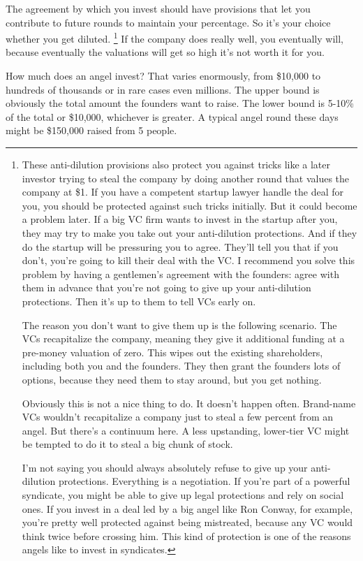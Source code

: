 The agreement by which you invest should have provisions that let you
contribute to future rounds to maintain your percentage. So it's your
choice whether you get diluted. \footnote{These anti-dilution provisions also protect you against tricks
like a later investor trying to steal the company by doing another round
that values the company at \$1. If you have a competent startup lawyer
handle the deal for you, you should be protected against such tricks
initially. But it could become a problem later. If a big VC firm wants
to invest in the startup after you, they may try to make you take out
your anti-dilution protections. And if they do the startup will be
pressuring you to agree. They'll tell you that if you don't, you're
going to kill their deal with the VC. I recommend you solve this problem
by having a gentlemen's agreement with the founders: agree with them in
advance that you're not going to give up your anti-dilution protections.
Then it's up to them to tell VCs early on.

The reason you don't want to give them up is the following scenario. The
VCs recapitalize the company, meaning they give it additional funding at
a pre-money valuation of zero. This wipes out the existing shareholders,
including both you and the founders. They then grant the founders lots
of options, because they need them to stay around, but you get nothing.

Obviously this is not a nice thing to do. It doesn't happen often.
Brand-name VCs wouldn't recapitalize a company just to steal a few
percent from an angel. But there's a continuum here. A less upstanding,
lower-tier VC might be tempted to do it to steal a big chunk of stock.

I'm not saying you should always absolutely refuse to give up your
anti-dilution protections. Everything is a negotiation. If you're part
of a powerful syndicate, you might be able to give up legal protections
and rely on social ones. If you invest in a deal led by a big angel like
Ron Conway, for example, you're pretty well protected against being
mistreated, because any VC would think twice before crossing him. This
kind of protection is one of the reasons angels like to invest in
syndicates.} If the company
does really well, you eventually will, because eventually the valuations
will get so high it's not worth it for you.

How much does an angel invest? That varies enormously, from \$10,000 to
hundreds of thousands or in rare cases even millions. The upper bound is
obviously the total amount the founders want to raise. The lower bound
is 5-10\% of the total or \$10,000, whichever is greater. A typical
angel round these days might be \$150,000 raised from 5 people.

